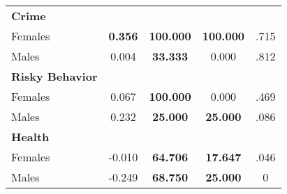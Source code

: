 \begin{tabular}{l c c c c}
\midrule
\textbf{Crime} & & & & \\
\quad Females &  \textbf{    0.356} & \textbf{  100.000} & \textbf{  100.000} & .715 \\
\quad Males &      0.004 & \textbf{   33.333} &     0.000 & .812 \\
\midrule
\textbf{Risky Behavior} & & & & \\
\quad Females &      0.067 & \textbf{  100.000} &     0.000 & .469 \\
\quad Males &      0.232 & \textbf{   25.000} & \textbf{   25.000} & .086 \\
\midrule
\textbf{Health} & & & & \\
\quad Females &     -0.010 & \textbf{   64.706} & \textbf{   17.647} & .046 \\
\quad Males &     -0.249 & \textbf{   68.750} & \textbf{   25.000} & 0 \\
\bottomrule
\end{tabular}
